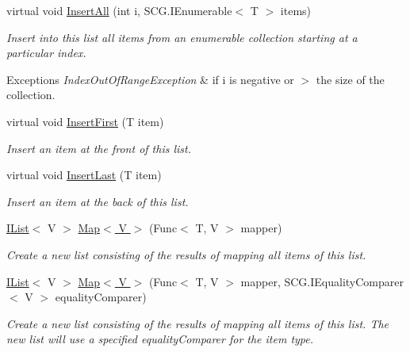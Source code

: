 \begin{DoxyCompactItemize}
virtual void \hyperlink{class_c5_1_1_hashed_linked_list_a6e309a1f1e92f363e9a49695cb3e5ce2}{Insert\+All} (int i, S\+C\+G.\+I\+Enumerable$<$ T $>$ items)
\begin{DoxyCompactList}\small\item\em Insert into this list all items from an enumerable collection starting at a particular index. 
\begin{DoxyExceptions}{Exceptions}
{\em Index\+Out\+Of\+Range\+Exception} & if i is negative or $>$ the size of the collection. \\
\hline
\end{DoxyExceptions}
\end{DoxyCompactList}\item 
virtual void \hyperlink{class_c5_1_1_hashed_linked_list_ae02598bb941fbd2665b3b05c317aeadb}{Insert\+First} (T item)
\begin{DoxyCompactList}\small\item\em Insert an item at the front of this list. \end{DoxyCompactList}\item 
virtual void \hyperlink{class_c5_1_1_hashed_linked_list_a315e3df7f01e031e71d2da0581ee2598}{Insert\+Last} (T item)
\begin{DoxyCompactList}\small\item\em Insert an item at the back of this list. \end{DoxyCompactList}\item 
\hyperlink{interface_c5_1_1_i_list}{I\+List}$<$ V $>$ \hyperlink{class_c5_1_1_hashed_linked_list_adc35379b5a56bbaf7790dd26bcc8ab6b}{Map$<$ V $>$} (Func$<$ T, V $>$ mapper)
\begin{DoxyCompactList}\small\item\em Create a new list consisting of the results of mapping all items of this list. \end{DoxyCompactList}\item 
\hyperlink{interface_c5_1_1_i_list}{I\+List}$<$ V $>$ \hyperlink{class_c5_1_1_hashed_linked_list_a5785aad402110c74b1d100ba504d1d90}{Map$<$ V $>$} (Func$<$ T, V $>$ mapper, S\+C\+G.\+I\+Equality\+Comparer$<$ V $>$ equality\+Comparer)
\begin{DoxyCompactList}\small\item\em Create a new list consisting of the results of mapping all items of this list. The new list will use a specified equality\+Comparer for the item type. \end{DoxyCompactList}\item 

\end{DoxyCompactItemize}
